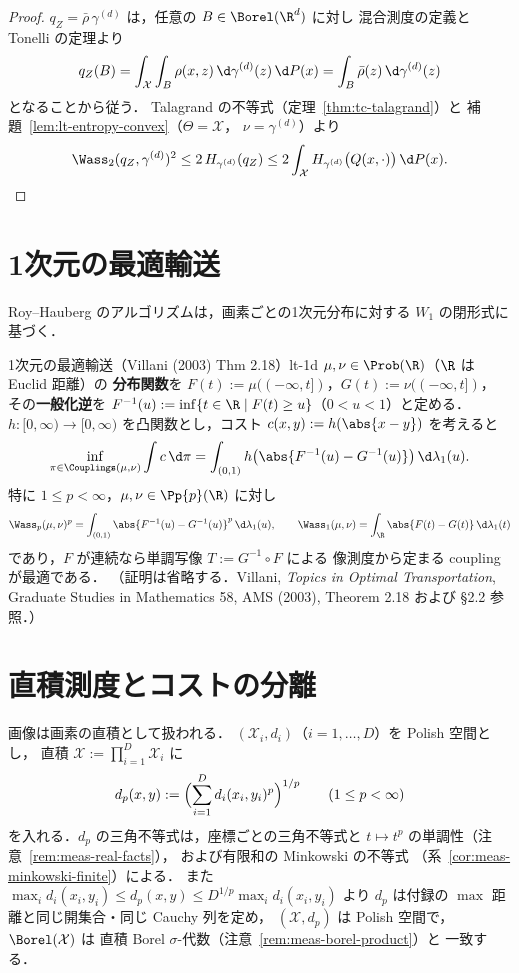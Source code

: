 \begin{proof}
  $q_Z=\bar\rho\,\gamma^{(d)}$ は，任意の $B\in\Borel(\R^d)$ に対し
  混合測度の定義と Tonelli の定理より
  \[
    q_Z(B)=\int_{\mathcal{X}}\int_B\rho(x,z)\,\d\gamma^{(d)}(z)\,\d P(x)
    =\int_B\bar\rho(z)\,\d\gamma^{(d)}(z)
  \]
  となることから従う．
  Talagrand の不等式（定理~\ref{thm:tc-talagrand}）と
  補題~\ref{lem:lt-entropy-convex}（$\Theta=\mathcal{X}$，
  $\nu=\gamma^{(d)}$）より
  \[
    \Wass_2(q_Z,\gamma^{(d)})^2
    \leq2\,H_{\gamma^{(d)}}(q_Z)
    \leq2\int_{\mathcal{X}}H_{\gamma^{(d)}}\bigl(Q(x,\cdot)\bigr)\,\d P(x).
    \qedhere
  \]
\end{proof}

\section{1次元の最適輸送}
\label{sec:lt-1d}

Roy--Hauberg のアルゴリズムは，画素ごとの1次元分布に対する
$W_1$ の閉形式に基づく．

\begin{theorem}{1次元の最適輸送（Villani (2003) Thm 2.18）}{lt-1d}
  $\mu,\nu\in\Prob(\R)$（$\R$ は Euclid 距離）の
  \textbf{分布関数}を
  $F(t):=\mu((-\infty,t])$，$G(t):=\nu((-\infty,t])$，
  その\textbf{一般化逆}を
  $F^{-1}(u):=\inf\{t\in\R\mid F(t)\geq u\}$（$0<u<1$）と定める．
  $h\colon[0,\infty)\to[0,\infty)$ を凸関数とし，コスト
  $c(x,y):=h(\abs{x-y})$ を考えると
  \[
    \inf_{\pi\in\Couplings(\mu,\nu)}\int c\,\d\pi
    =\int_{(0,1)}h\bigl(\abs{F^{-1}(u)-G^{-1}(u)}\bigr)\,\d\lambda_1(u).
  \]
  特に $1\leq p<\infty$，$\mu,\nu\in\Pp{p}(\R)$ に対し
  \[
    \Wass_p(\mu,\nu)^p
    =\int_{(0,1)}\abs{F^{-1}(u)-G^{-1}(u)}^p\,\d\lambda_1(u),
    \qquad
    \Wass_1(\mu,\nu)=\int_\R\abs{F(t)-G(t)}\,\d\lambda_1(t)
  \]
  であり，$F$ が連続なら単調写像 $T:=G^{-1}\circ F$ による
  像測度から定まる coupling が最適である．
  （証明は省略する．Villani,
  \emph{Topics in Optimal Transportation},
  Graduate Studies in Mathematics 58, AMS (2003),
  Theorem 2.18 および §2.2 参照．）
\end{theorem}

\section{直積測度とコストの分離}
\label{sec:lt-product}

画像は画素の直積として扱われる．
$(\mathcal{X}_i,d_i)$（$i=1,\dots,D$）を Polish 空間とし，
直積 $\mathcal{X}:=\prod_{i=1}^D\mathcal{X}_i$ に
\[
  d_p(x,y):=\Bigl(\sum_{i=1}^Dd_i(x_i,y_i)^p\Bigr)^{1/p}
  \qquad(1\leq p<\infty)
\]
を入れる．$d_p$ の三角不等式は，座標ごとの三角不等式と
$t\mapsto t^p$ の単調性（注意~\ref{rem:meas-real-facts}），
および有限和の Minkowski の不等式
（系~\ref{cor:meas-minkowski-finite}）による．
また
$\max_id_i(x_i,y_i)\leq d_p(x,y)\leq D^{1/p}\max_id_i(x_i,y_i)$
より $d_p$ は付録の $\max$ 距離と同じ開集合・同じ Cauchy 列を定め，
$(\mathcal{X},d_p)$ は Polish 空間で，$\Borel(\mathcal{X})$ は
直積 Borel $\sigma$-代数（注意~\ref{rem:meas-borel-product}）と
一致する．

